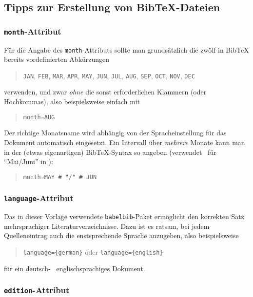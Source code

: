 \subsection{Tipps zur Erstellung von BibTeX-Dateien}
\label{sec:TippsZuBibtex}

\subsubsection{\texttt{month}-Attribut}

Für die Angabe des \texttt{month}-Attributs sollte man grundsätzlich die zwölf in BibTeX bereits vordefinierten Abkürzungen
\begin{quote}
\texttt{JAN}, \texttt{FEB}, \texttt{MAR}, \texttt{APR}, 
\texttt{MAY}, \texttt{JUN}, \texttt{JUL}, \texttt{AUG}, 
\texttt{SEP}, \texttt{OCT}, \texttt{NOV}, \texttt{DEC}
\end{quote}
verwenden, und zwar \emph{ohne} die sonst erforderlichen Klammern (oder Hochkommas), also beispielsweise einfach mit
%
\begin{quote}
\verb!month=AUG!
\end{quote}
%
Der richtige Monatsname wird abhängig von der Spracheinstellung für das Dokument automatisch eingesetzt.
Ein Intervall über \emph{mehrere} Monate kann man in der (etwas eigenartigen) BibTeX-Syntax so angeben (verwendet \zB\ für "`Mai/Juni"' in \cite{Guttman01}):
\begin{quote}
\verb!month=MAY # "/" # JUN!
\end{quote}


\subsubsection{\texttt{language}-Attribut}

Das in dieser Vorlage verwendete \verb!babelbib!-Paket ermöglicht den korrekten Satz mehrsprachiger Literaturverzeichnisse. Dazu ist es ratsam, bei jedem Quelleneintrag auch die enstsprechende Sprache anzugeben, also beispielsweise
\begin{quote}
\verb!language={german}! \quad oder \quad \verb!language={english}!
\end{quote}
für ein deutsch- \bzw\ englischsprachiges Dokument.

\subsubsection{\texttt{edition}-Attribut}

